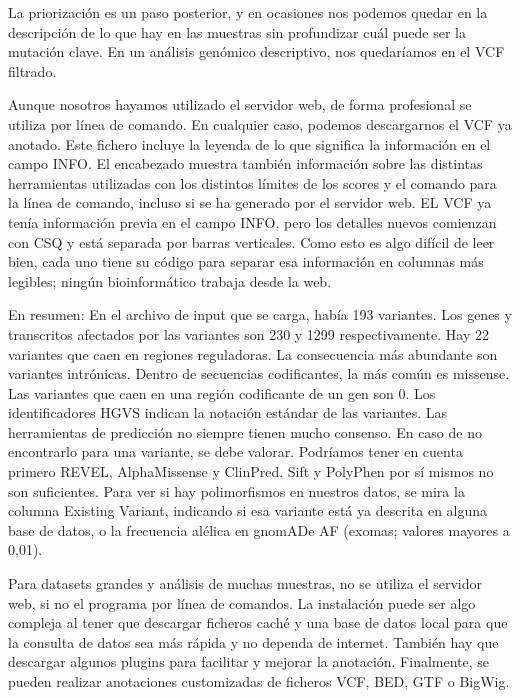 La priorización es un paso posterior, y en ocasiones nos podemos quedar en la descripción de lo que hay en las muestras sin profundizar cuál puede ser la mutación clave. En un análisis genómico descriptivo, nos quedaríamos en el VCF filtrado. 

Aunque nosotros hayamos utilizado el servidor web, de forma profesional se utiliza por línea de comando. En cualquier caso, podemos descargarnos el VCF ya anotado. Este fichero incluye la leyenda de lo que significa la información en el campo INFO. El encabezado muestra también información sobre las distintas herramientas utilizadas con los distintos límites de los scores y el comando para la línea de comando, incluso si se ha generado por el servidor web. EL VCF ya tenía información previa en el campo INFO, pero los detalles nuevos comienzan con CSQ y está separada por barras verticales. Como esto es algo difícil de leer bien, cada uno tiene su código para separar esa información en columnas más legibles; ningún bioinformático trabaja desde la web.

En resumen: En el archivo de input que se carga, había 193 variantes. Los genes y transcritos afectados por las variantes son 230 y 1299 respectivamente. Hay 22 variantes que caen en regiones reguladoras. La consecuencia más abundante son variantes intrónicas. Dentro de secuencias codificantes, la más común es missense. Las variantes que caen en una región codificante de un gen son 0. Los identificadores HGVS indican la notación estándar de las variantes. Las herramientas de predicción no siempre tienen mucho consenso. En caso de no encontrarlo para una variante, se debe valorar. Podríamos tener en cuenta primero REVEL, AlphaMissense y ClinPred. Sift y PolyPhen por sí mismos no son suficientes. Para ver si hay polimorfismos en nuestros datos, se mira la columna Existing Variant, indicando si esa variante está ya descrita en alguna base de datos, o la frecuencia alélica en gnomADe AF (exomas; valores mayores a 0,01).

Para datasets grandes y análisis de muchas muestras, no se utiliza el servidor web, si no el programa por línea de comandos. La instalación puede ser algo compleja al tener que descargar ficheros caché y una base de datos local para que la consulta de datos sea más rápida y no dependa de internet. También hay que descargar algunos plugins para facilitar y mejorar la anotación. Finalmente, se pueden realizar anotaciones customizadas de ficheros VCF, BED, GTF o BigWig.

